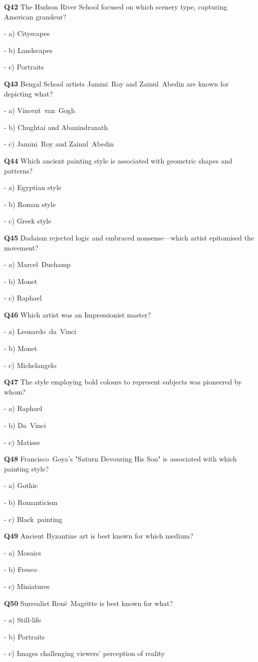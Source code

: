 \textbf{Q42} The Hudson River School focused on which scenery type, capturing American grandeur?\par
\quad - a) Cityscapes\par
\quad - b) Landscapes\par
\quad - c) Portraits\par

\textbf{Q43} Bengal School artists Jamini Roy and Zainul Abedin are known for depicting what?\par
\quad - a) Vincent van Gogh\par
\quad - b) Chughtai and Abanindranath\par
\quad - c) Jamini Roy and Zainul Abedin\par

\textbf{Q44} Which ancient painting style is associated with geometric shapes and patterns?\par
\quad - a) Egyptian style\par
\quad - b) Roman style\par
\quad - c) Greek style\par

\textbf{Q45} Dadaism rejected logic and embraced nonsense—which artist epitomised the movement?\par
\quad - a) Marcel Duchamp\par
\quad - b) Monet\par
\quad - c) Raphael\par

\textbf{Q46} Which artist was an Impressionist master?\par
\quad - a) Leonardo da Vinci\par
\quad - b) Monet\par
\quad - c) Michelangelo\par

\textbf{Q47} The style employing bold colours to represent subjects was pioneered by whom?\par
\quad - a) Raphael\par
\quad - b) Da Vinci\par
\quad - c) Matisse\par

\textbf{Q48} Francisco Goya's "Saturn Devouring His Son" is associated with which painting style?\par
\quad - a) Gothic\par
\quad - b) Romanticism\par
\quad - c) Black painting\par

\textbf{Q49} Ancient Byzantine art is best known for which medium?\par
\quad - a) Mosaics\par
\quad - b) Fresco\par
\quad - c) Miniatures\par

\textbf{Q50} Surrealist René Magritte is best known for what?\par
\quad - a) Still‑life\par
\quad - b) Portraits\par
\quad - c) Images challenging viewers' perception of reality\par
